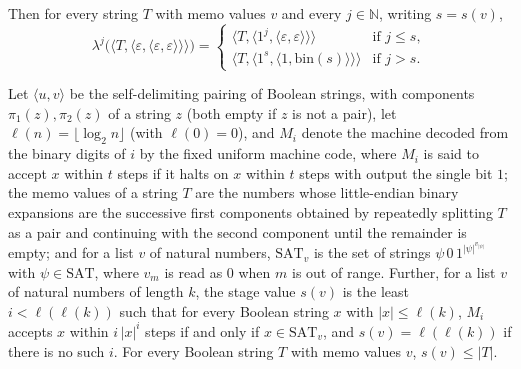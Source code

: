 \begin{theorem}
Then for every string $T$ with memo values $v$ and every $j\in\mathbb N$, writing $s=s(v)$,
\[
  \lambda^{j}\bigl(\langle T,\langle\varepsilon,\langle\varepsilon,\varepsilon\rangle\rangle\rangle\bigr)
  =\begin{cases}
    \langle T,\langle 1^{j},\langle\varepsilon,\varepsilon\rangle\rangle\rangle & \text{if } j\le s,\\
    \langle T,\langle 1^{s},\langle 1,\mathrm{bin}(s)\rangle\rangle\rangle & \text{if } j>s.
  \end{cases}
\]
\end{theorem}

\begin{theorem}
\label{Complexity.ladner_stage_length_le}
\leanok
{}
Let $\langle u,v\rangle$ be the self-delimiting pairing of Boolean strings, with components $\pi_1(z),\pi_2(z)$ of a string $z$ (both empty if $z$ is not a pair), let $\ell(n)=\lfloor\log_2 n\rfloor$ (with $\ell(0)=0$), and $M_i$ denote the machine decoded from the binary digits of $i$ by the fixed uniform machine code, where $M_i$ is said to accept $x$ within $t$ steps if it halts on $x$ within $t$ steps with output the single bit $1$; the memo values of a string $T$ are the numbers whose little-endian binary expansions are the successive first components obtained by repeatedly splitting $T$ as a pair and continuing with the second component until the remainder is empty; and for a list $v$ of natural numbers, $\mathrm{SAT}_v$ is the set of strings $\psi\,0\,1^{|\psi|^{v_{|\psi|}}}$ with $\psi\in\mathrm{SAT}$, where $v_m$ is read as $0$ when $m$ is out of range. Further, for a list $v$ of natural numbers of length $k$, the stage value $s(v)$ is the least $i<\ell(\ell(k))$ such that for every Boolean string $x$ with $|x|\le\ell(k)$, $M_i$ accepts $x$ within $i\,|x|^i$ steps if and only if $x\in\mathrm{SAT}_v$, and $s(v)=\ell(\ell(k))$ if there is no such $i$. For every Boolean string $T$ with memo
values $v$, $s(v)\le|T|$.
\end{theorem}

